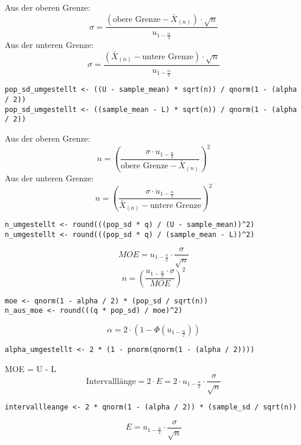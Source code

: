 \begin{multicols*}{2}
Aus der oberen Grenze:
$$
\sigma = \frac{\left( \text{obere Grenze} - \bar{X}_{(n)} \right) \cdot \sqrt{n}}{u_{1 - \frac{\alpha}{2}}}
$$
Aus der unteren Grenze:
$$
\sigma = \frac{\left( \bar{X}_{(n)} - \text{untere Grenze} \right) \cdot \sqrt{n}}{u_{1 - \frac{\alpha}{2}}}
$$
\begin{lstlisting}
pop_sd_umgestellt <- ((U - sample_mean) * sqrt(n)) / qnorm(1 - (alpha / 2))
pop_sd_umgestellt <- ((sample_mean - L) * sqrt(n)) / qnorm(1 - (alpha / 2))
\end{lstlisting}


Aus der oberen Grenze:
$$
n = \left( \frac{\sigma \cdot u_{1 - \frac{\alpha}{2}}}{\text{obere Grenze} - \bar{X}_{(n)}} \right)^2
$$
Aus der unteren Grenze:
$$
n = \left( \frac{\sigma \cdot u_{1 - \frac{\alpha}{2}}}{\bar{X}_{(n)} - \text{untere Grenze}} \right)^2
$$
\begin{lstlisting}
n_umgestellt <- round(((pop_sd * q) / (U - sample_mean))^2)
n_umgestellt <- round(((pop_sd * q) / (sample_mean - L))^2)
\end{lstlisting}
$$
MOE = u_{1 - \frac{\alpha}{2}} \cdot \frac{\sigma}{\sqrt{n}}
$$
$$
n = \left( \frac{u_{1 - \frac{\alpha}{2}} \cdot \sigma}{MOE} \right)^2
$$
\begin{lstlisting}
moe <- qnorm(1 - alpha / 2) * (pop_sd / sqrt(n))
n_aus_moe <- round(((q * pop_sd) / moe)^2)
\end{lstlisting}
$$
\alpha = 2 \cdot \left( 1 - \Phi(u_{1 - \frac{\alpha}{2}}) \right)
$$
\begin{lstlisting}
alpha_umgestellt <- 2 * (1 - pnorm(qnorm(1 - (alpha / 2))))
\end{lstlisting}
MOE = U - L
$$
\text{Intervalllänge} = 2 \cdot E = 2 \cdot u_{1 - \frac{\alpha}{2}} \cdot \frac{\sigma}{\sqrt{n}}
$$
\begin{lstlisting}
intervallleange <- 2 * qnorm(1 - (alpha / 2)) * (sample_sd / sqrt(n))
\end{lstlisting}

$$
E = u_{1 - \frac{\alpha}{2}} \cdot \frac{\sigma}{\sqrt{n}}
$$

\end{multicols*}